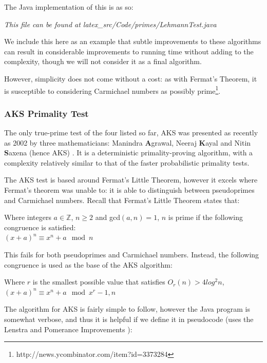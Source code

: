     The Java implementation of this is as so:
    
    \emph{This file can be found at latex\_src/Code/primes/LehmannTest.java}
    
    We include this here as an example that subtle improvements to these algorithms can result in considerable improvements to running time\cite{Kendal:2012rt} without adding to the complexity, though we will not consider it as a final algorithm.
    
    However, simplicity does not come without a cost: as with Fermat's Theorem, it is susceptible to considering Carmichael numbers as possibly prime\footnote{http://news.ycombinator.com/item?id=3373284}.
    
    \subsubsection{AKS Primality Test}
    
    The only true-prime test of the four listed so far, AKS was presented as recently as 2002 by three mathematicians: Manindra \textbf{A}grawal, Neeraj \textbf{K}ayal and Nitin \textbf{S}axena (hence AKS) \cite{Agrawal:2002aa}. It is a deterministic primality-proving algorithm, with a complexity relatively similar to that of the faster probabilistic primality tests.
    
    The AKS test is based around Fermat's Little Theorem, however it excels where Fermat's theorem was unable to: it is able to distinguish between pseudoprimes and Carmichael numbers. Recall that Fermat's Little Theorem states that: 
    
    \begin{mathfact}
      Where integers $a \in \mathbb{Z}$, $n \geq 2$ and gcd$(a,n)=1$, $n$ is prime if the following congruence is satisfied: \\
      $(x+a)^n \equiv x^n + a \mod{n}$ 
    \end{mathfact}
    
    This fails for both pseudoprimes and Carmichael numbers. Instead, the following congruence is used as the base of the AKS algorithm: 
    
    \begin{mathdef}
      Where $r$ is the smallest possible value that satisfies $O_r(n) > 4log^2n$,\\
       $(x+a)^n \equiv x^n + a \mod{x^r -1, n}$ 
    \end{mathdef}
    
    The algorithm for AKS is fairly simple to follow, however the Java program is somewhat verbose, and thus it is helpful if we define it in pseudocode (uses the Lenstra and Pomerance Improvements \cite{Salembier:2005aa}):
    
